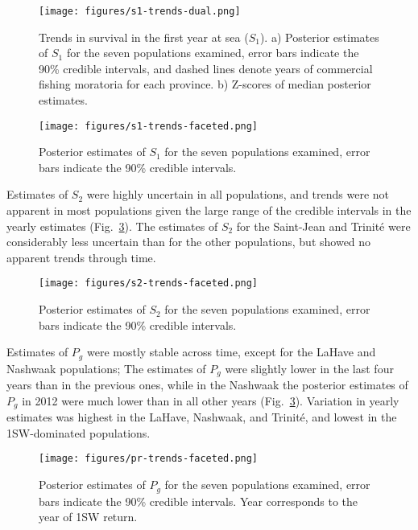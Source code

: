 \documentclass[12pt]{article}
\newcommand{\So}{$S_{1}$\xspace}
\newcommand{\St}{$S_{2}$\xspace}
\newcommand{\Pg}{$P_g$\xspace}
\begin{document}
\begin{figure}[htbp] \centering
    \texttt{[image: figures/s1-trends-dual.png]}
    \caption{Trends in survival in the first year at sea (\So). a) Posterior
        estimates of \So for the seven populations examined, error bars indicate
        the 90\% credible intervals, and dashed lines denote years of commercial
        fishing moratoria for each province. b) Z-scores of median posterior
        estimates.} \label{fig:s1-dual} \end{figure}

\begin{figure}[htbp] \centering
    \texttt{[image: figures/s1-trends-faceted.png]}
    \caption{Posterior estimates of \So for the seven populations examined, error
        bars indicate the 90\% credible intervals.} \label{fig:s1-faceted}
\end{figure}

Estimates of \St were highly uncertain in all populations, and trends 
were not apparent in most populations given the large range of the credible
intervals in the yearly estimates (Fig.~\ref{fig:s2-faceted}). The estimates
of \St for the Saint-Jean and Trinit\'{e} were considerably less uncertain
than for the other populations, but showed no apparent trends through time.

\begin{figure}[htbp] \centering
    \texttt{[image: figures/s2-trends-faceted.png]}
    \caption{Posterior estimates of \St for the seven populations examined, error
        bars indicate the 90\% credible intervals.} \label{fig:s2-faceted}
\end{figure}

Estimates of \Pg were mostly stable across time, except for the LaHave and
Nashwaak populations; The estimates of \Pg were slightly lower in the last four
years than in the previous ones, while in the Nashwaak the posterior estimates
of \Pg in 2012 were much lower than in all other years
(Fig.~\ref{fig:s2-faceted}). Variation in yearly estimates was highest in
the LaHave, Nashwaak, and Trinit\'{e}, and lowest in the 1SW-dominated
populations.

\begin{figure}[htbp] \centering
    \texttt{[image: figures/pr-trends-faceted.png]}
    \caption{Posterior estimates of \Pg for the seven populations examined, error
        bars indicate the 90\% credible intervals. Year corresponds to the
        year of 1SW return.} \label{fig:pr-faceted} 
\end{figure}
\end{document}
